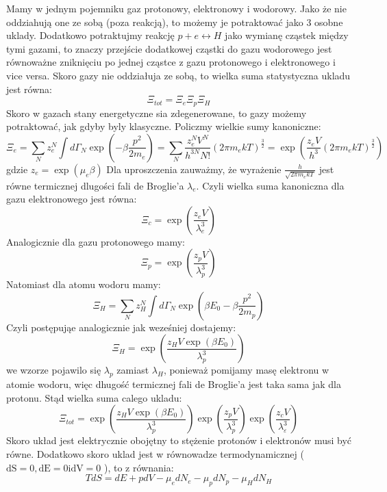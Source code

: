 \documentclass[12pt,a4paper]{article}
\begin{document}
Mamy w jednym pojemniku gaz protonowy, elektronowy i wodorowy. Jako że nie oddziahują one ze sobą (poza reakcją), to możemy je potraktować jako 3 osobne uklady. Dodatkowo potraktujmy reakcję $p+e \leftrightarrow H$ jako wymianę cząstek między tymi gazami, to znaczy przejście dodatkowej cząstki do gazu wodorowego jest równoważne zniknięciu po jednej cząstce z gazu protonowego i elektronowego i vice versa. Skoro gazy nie oddziałuja ze sobą, to wielka suma statystyczna ukladu jest równa:
$$
\Xi_{t o t}=\Xi_{e} \Xi_{p} \Xi_{H}
$$
Skoro w gazach stany energetyczne sia zdegenerowane, to gazy możemy potraktować, jak gdyby byly klasyczne. Policzmy wielkie sumy kanoniczne:
$$
\Xi_{e}=\sum_{N} z_{e}^{N} \int d \Gamma_{N} \exp \left(-\beta \frac{p^{2}}{2 m_{e}}\right)=\sum_{N} \frac{z_{e}^{N} V^{N}}{h^{3 N} N !}\left(2 \pi m_{e} k T\right)^{\frac{3}{2}}=\exp \left(\frac{z_{e} V}{h^{3}}\left(2 \pi m_{e} k T\right)^{\frac{3}{2}}\right)
$$
gdzie $z_{e}=\exp \left(\mu_{e} \beta\right)$ Dla uproszczenia zauważmy, że wyrażenie $\frac{h}{\sqrt{2 \pi m_{e} k T}}$ jest równe termicznej dlugości fali de Broglie'a $\lambda_{e}$. Czyli wielka suma kanoniczna dla gazu elektronowego jest równa:
$$
\Xi_{c}=\exp \left(\frac{z_{e} V}{\lambda_{e}^{3}}\right)
$$
Analogicznie dla gazu protonowego mamy:
$$
\Xi_{p}=\exp \left(\frac{z_{p} V}{\lambda_{p}^{3}}\right)
$$
Natomiast dla atomu wodoru mamy:
$$
\Xi_{H}=\sum_{N} z_{H}^{N} \int d \Gamma_{N} \exp \left(\beta E_{0}-\beta \frac{p^{2}}{2 m_{p}}\right)
$$
Czyli postępująe analogicznie jak weześniej dostajemy:
$$
\Xi_{H}=\exp \left(\frac{z_{H} V \exp \left(\beta E_{0}\right)}{\lambda_{p}^{3}}\right)
$$
we wzorze pojawilo się $\lambda_{p}$ zamiast $\lambda_{H}$, ponieważ pomijamy masę elektronu w atomie wodoru, więc dhugość termicznej fali de Broglie'a jest taka sama jak dla protonu. Stąd wielka suma calego ukladu:
$$
\Xi_{t o t}=\exp \left(\frac{z_{H} V \exp \left(\beta E_{0}\right)}{\lambda_{p}^{3}}\right) \exp \left(\frac{z_{p} V}{\lambda_{p}^{3}}\right) \exp \left(\frac{z_{c} V}{\lambda_{\varepsilon}^{3}}\right)
$$
Skoro układ jest elektrycznie obojętny to stężenie protonów i elektronów musi być równe. Dodatkowo skoro uklad jest w równowadze termodynamicznej ( $\mathrm{dS}=0, \mathrm{dE}=0 \mathrm{i} \mathrm{dV}=0$ ), to z równania:
$$
T d S=d E+p d V-\mu_{e} d N_{e}-\mu_{p} d N_{p}-\mu_{H} d N_{H}
$$
\end{document}
